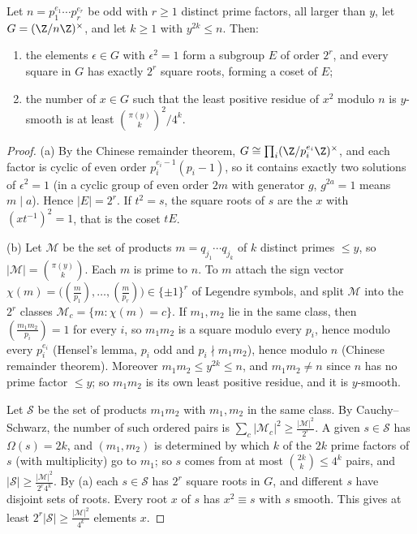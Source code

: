 \begin{lemma}[Dixon]\label{lem:dixon}
Let $n=p_1^{e_1}\cdots p_r^{e_r}$ be odd with $r\ge1$ distinct prime factors, all larger than $y$, let $G=(\Z/n\Z)^\times$, and let $k\ge1$ with $y^{2k}\le n$. Then:
\begin{enumerate}[label=(\alph*)]
\item the elements $\epsilon\in G$ with $\epsilon^2=1$ form a subgroup $E$ of order $2^r$, and every square in $G$ has exactly $2^r$ square roots, forming a coset of $E$;
\item the number of $x\in G$ such that the least positive residue of $x^2$ modulo $n$ is $y$-smooth is at least $\binom{\pi(y)}k^2/4^k$.
\end{enumerate}
\end{lemma}
\begin{proof}
(a) By the Chinese remainder theorem, $G\cong\prod_i(\Z/p_i^{e_i}\Z)^\times$, and each factor is cyclic of even order $p_i^{e_i-1}(p_i-1)$, so it contains exactly two solutions of $\epsilon^2=1$ (in a cyclic group of even order $2m$ with generator $g$, $g^{2a}=1$ means $m\mid a$). Hence $|E|=2^r$. If $t^2=s$, the square roots of $s$ are the $x$ with $(xt^{-1})^2=1$, that is the coset $tE$.

(b) Let $\mathcal M$ be the set of products $m=q_{j_1}\cdots q_{j_k}$ of $k$ distinct primes $\le y$, so $|\mathcal M|=\binom{\pi(y)}k$. Each $m$ is prime to $n$. To $m$ attach the sign vector $\chi(m)=\bigl((\frac m{p_1}),\dots,(\frac m{p_r})\bigr)\in\{\pm1\}^r$ of Legendre symbols, and split $\mathcal M$ into the $2^r$ classes $\mathcal M_c=\{m:\chi(m)=c\}$. If $m_1,m_2$ lie in the same class, then $(\frac{m_1m_2}{p_i})=1$ for every $i$, so $m_1m_2$ is a square modulo every $p_i$, hence modulo every $p_i^{e_i}$ (Hensel's lemma, $p_i$ odd and $p_i\nmid m_1m_2$), hence modulo $n$ (Chinese remainder theorem). Moreover $m_1m_2\le y^{2k}\le n$, and $m_1m_2\ne n$ since $n$ has no prime factor $\le y$; so $m_1m_2$ is its own least positive residue, and it is $y$-smooth.

Let $\mathcal S$ be the set of products $m_1m_2$ with $m_1,m_2$ in the same class. By Cauchy--Schwarz, the number of such ordered pairs is $\sum_c|\mathcal M_c|^2\ge\frac{|\mathcal M|^2}{2^r}$. A given $s\in\mathcal S$ has $\Omega(s)=2k$, and $(m_1,m_2)$ is determined by which $k$ of the $2k$ prime factors of $s$ (with multiplicity) go to $m_1$; so $s$ comes from at most $\binom{2k}k\le4^k$ pairs, and $|\mathcal S|\ge\frac{|\mathcal M|^2}{2^r4^k}$. By (a) each $s\in\mathcal S$ has $2^r$ square roots in $G$, and different $s$ have disjoint sets of roots. Every root $x$ of $s$ has $x^2\equiv s$ with $s$ smooth. This gives at least $2^r|\mathcal S|\ge\frac{|\mathcal M|^2}{4^k}$ elements $x$.
\end{proof}


